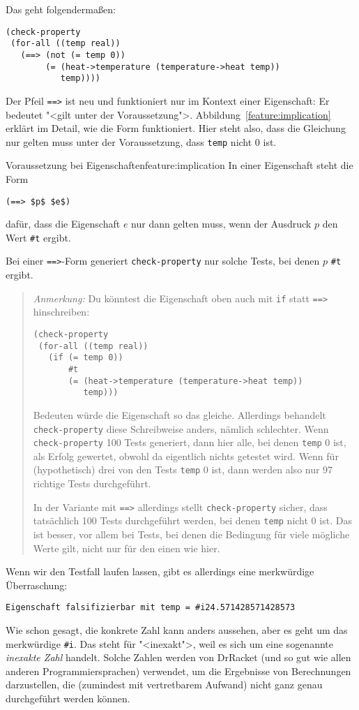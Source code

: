 Das geht folgendermaßen:
%
\begin{lstlisting}
(check-property
 (for-all ((temp real))
   (==> (not (= temp 0))
        (= (heat->temperature (temperature->heat temp))
           temp))))
\end{lstlisting}
%
Der Pfeil \lstinline{==>} ist neu und funktioniert nur im Kontext
einer Eigenschaft: Er bedeutet "<gilt unter der Voraussetzung">.
Abbildung~\ref{feature:implication} erklärt im Detail, wie die Form
funktioniert.  Hier steht also, dass die Gleichung nur gelten muss
unter der Voraussetzung, dass \lstinline{temp} nicht 0 ist.

\begin{feature}{Voraussetzung bei Eigenschaften}{feature:implication}
  In einer Eigenschaft steht die Form
\begin{lstlisting}
(==> $p$ $e$)
\end{lstlisting}
  dafür, dass die Eigenschaft $e$ nur dann gelten muss, wenn der
  Ausdruck $p$ den Wert \lstinline{#t} ergibt.

  Bei einer \lstinline{==>}-Form generiert \lstinline{check-property}
  nur solche Tests, bei denen $p$ \lstinline{#t} ergibt.
\end{feature}
%
\begin{quote}
\noindent \emph{Anmerkung:} Du könntest die Eigenschaft oben
auch mit \lstinline{if} statt \lstinline{==>} hinschreiben:
%
\begin{lstlisting}
(check-property
 (for-all ((temp real))
   (if (= temp 0))
       #t
       (= (heat->temperature (temperature->heat temp))
          temp)))
\end{lstlisting}
%
Bedeuten würde die Eigenschaft so das gleiche.  Allerdings behandelt
\lstinline{check-property} diese Schreibweise anders, nämlich
schlechter.  Wenn \lstinline{check-property} 100 Tests generiert, dann
hier alle, bei denen \lstinline{temp} 0 ist, als Erfolg gewertet,
obwohl da eigentlich nichts getestet wird.  Wenn für (hypothetisch)
drei von den Tests \lstinline{temp} 0 ist, dann werden also nur 97
richtige Tests durchgeführt.

In der Variante mit \lstinline{==>} allerdings stellt
\lstinline{check-property} sicher, dass tatsächlich 100 Tests
durchgeführt werden, bei denen \lstinline{temp} nicht 0 ist.  Das ist
besser, vor allem bei Tests, bei denen die Bedingung für viele
mögliche Werte gilt, nicht nur für den einen wie hier.
\end{quote}
%
Wenn wir den Testfall laufen lassen, gibt es allerdings eine
merkwürdige Überraschung:
%
\begin{lstlisting}
Eigenschaft falsifizierbar mit temp = #i24.571428571428573
\end{lstlisting}
%
Wie schon gesagt, die konkrete Zahl kann anders aussehen, aber es geht
um das merkwürdige \lstinline{#i}.  Das steht für "<inexakt">, weil es
sich um eine sogenannte \textit{inexakte Zahl}
handelt.  Solche Zahlen werden von DrRacket (und so gut wie allen
anderen Programmiersprachen) verwendet, um die Ergebnisse von
Berechnungen darzustellen, die (zumindest mit vertretbarem Aufwand)
nicht ganz genau durchgeführt werden können.

